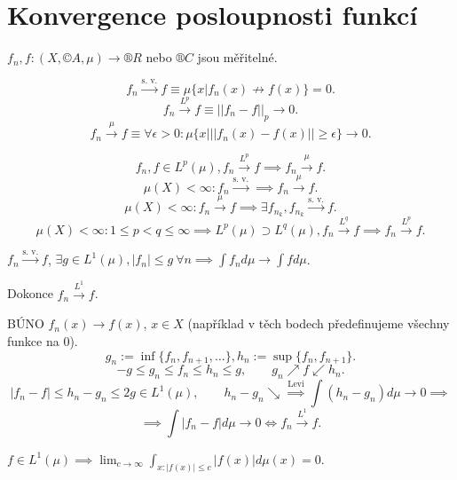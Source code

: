 \documentclass[12pt]{article}					%
\begin{document}
\section{Konvergence posloupnosti funkcí}
\begin{poznamka}
	$f_n, f: (X, ©A, \mu) \rightarrow ®R$ nebo $®C$ jsou měřitelné.

	$$ f_n \overset{\text{s. v.}}{\rightarrow} f ≡ \mu\{x | f_n(x) \not\rightarrow f(x)\} = 0. $$
	$$ f_n \overset{L^p}{\rightarrow} f ≡ ||f_n - f||_p \rightarrow 0. $$
	$$ f_n \overset{\mu}{\rightarrow} f ≡ \forall \epsilon > 0: \mu\{x | ||f_n(x) - f(x)|| ≥ \epsilon\} \rightarrow 0. $$

	\begin{tvrzeniin}
		$$ f_n, f \in L^p(\mu), f_n \overset{L^p}{\rightarrow} f \implies f_n \overset{\mu}{\rightarrow} f. $$
		$$ \mu(X) < ∞: f_n \overset{\text{s. v.}}{\rightarrow} \implies f_n \overset{\mu}{\rightarrow} f. $$
		$$ \mu(X) < ∞: f_n \overset{\mu}{\rightarrow} f \implies \exists f_{n_k}, f_{n_k} \overset{\text{s. v.}}{\rightarrow} f. $$
		$$ \mu(X) < ∞: 1 ≤ p < q ≤ ∞ \implies L^p(\mu) \supset L^q(\mu), f_n \overset{L^q}{\rightarrow} f \implies f_n \overset{L^p}{\rightarrow} f. $$
	\end{tvrzeniin}
\end{poznamka}

\begin{veta}
	$f_n \overset{\text{s. v.}}{\rightarrow} f$, $\exists g \in L^1(\mu), |f_n| ≤ g\ \forall n \implies \int f_n d\mu \rightarrow \int fd\mu$.

	Dokonce $f_n \overset{L^1}{\rightarrow} f$.

	\begin{dukazin}
		BÚNO $f_n(x) \rightarrow f(x)$, $x \in X$ (například v těch bodech předefinujeme všechny funkce na 0).
		$$ g_n := \inf\{f_n, f_{n+1}, …\}, h_n := \sup\{f_n, f_{n+1}\}. $$
		$$ -g ≤ g_n ≤ f_n ≤ h_n ≤ g, \qquad g_n \nearrow f \swarrow h_n. $$
		$$ |f_n - f| ≤ h_n - g_n ≤ 2g \in L^1(\mu), \qquad h_n - g_n \searrow \overset{\text{Levi}}{\implies} \int(h_n - g_n) d\mu \rightarrow 0 \implies $$
		$$ \implies \int |f_n - f| d\mu \rightarrow 0 \Leftrightarrow f_n \overset{L^1}{\rightarrow} f. $$
	\end{dukazin}
\end{veta}

\begin{poznamka}
	$f \in L^1(\mu) \implies \lim_{c \rightarrow ∞} \int_{x: |f(x)| ≤ c} |f(x)| d\mu(x) = 0$.
\end{poznamka}
\end{document}
